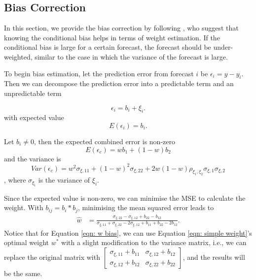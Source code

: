 \documentclass[11pt]{article}
\begin{document}
	\subsection{Bias Correction}\label{bias-correction}
	In this section, we provide the bias correction by following \cite{Gibbs2017}, who suggest that knowing the conditional bias helps in terms of weight estimation. If the conditional bias is large for a certain forecast, the forecast should be under-weighted, similar to the case in which the variance of the forecast is large.
	
	To begin bias estimation, let the prediction error from forecast \(i\) be \(\epsilon_i = y - y_i\). Then we can decompose the prediction error into a predictable term and an unpredictable term
	
	\begin{equation}
	\label{eqn: w bias assumption}
	\epsilon_i = b_i + \xi_i. 
	\end{equation}
	with expected value
	\begin{equation}
	\label{eqn: bias estimate}
	E(\epsilon_i) = b_i.
	\end{equation}
	
	Let $b_i \neq 0$, then the expected combined error is non-zero
	\begin{equation}
	E(\epsilon_c) = wb_1+(1-w)b_2
	\end{equation}
	and the variance is
	\begin{equation}
	Var(\epsilon_c) = w^2\sigma_{\xi,11} + (1-w)^2\sigma_{\xi,22} + 2w(1-w)\rho_{\xi_1,\xi_2}\sigma_{\xi,1}\sigma_{\xi,2}
	\end{equation},
	where $\sigma_{\xi_i}$ is the variance of $\xi_i$.
	
	Since the expected value is non-zero, we can minimise the MSE to calculate the weight.
	With \(b_{ij}=b_i*b_j\), minimising the mean squared error leads to
	\begin{equation}
	\label{eqn: w bias}
	\begin{aligned}
	\hat{w} &= \frac{\sigma_{\xi,22}-\sigma_{\xi,12}+b_{22}-b_{12}}{\sigma_{\xi,11}+\sigma_{\xi,22}-2\sigma_{\xi,12}+b_{11}+b_{22}-2b_{12}}.
	\end{aligned}
	\end{equation}
	Notice that for Equation \ref{eqn: w bias}, we can use Equation \ref{eqn: simple weight}'s optimal weight $w^*$ with a slight modification to the variance matrix, i.e., we can replace the original matrix with
	\(\begin{bmatrix}\sigma_{\xi,11}+b_{11} & \sigma_{\xi,12}+b_{12}\\ \sigma_{\xi,12}+b_{12} & \sigma_{\xi,22}+b_{22}\end{bmatrix}\), and the results will be the same.
	
\end{document}

